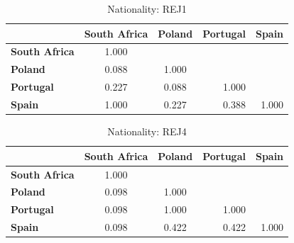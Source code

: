 \begin{table}
    \small
    \centering
    \begin{tabular}{lcccc}
        \toprule
                              & \multicolumn{1}{l}{\textbf{South Africa}} & \multicolumn{1}{l}{\textbf{Poland}} & \textbf{Portugal}         & \textbf{Spain}            \\
        \midrule
        \textbf{South Africa} & 1.000                                     & \multicolumn{1}{l}{}                &                           &                           \\
        \textbf{Poland}       & 0.088                                     & 1.000                               &                           &                           \\
        \textbf{Portugal}     & 0.227                                     & 0.088                               & \multicolumn{1}{r}{1.000} &                           \\
        \textbf{Spain}        & 1.000                                     & 0.227                               & \multicolumn{1}{r}{0.388} & \multicolumn{1}{r}{1.000} \\
        \bottomrule
    \end{tabular}
    \caption{Nationality: REJ1}
\end{table}

\begin{table}
    \small
    \centering
    \begin{tabular}{lcccc}
        \toprule
                              & \multicolumn{1}{l}{\textbf{South Africa}} & \multicolumn{1}{l}{\textbf{Poland}} & \textbf{Portugal}         & \textbf{Spain}            \\
        \midrule
        \textbf{South Africa} & 1.000                                     & \multicolumn{1}{l}{}                &                           &                           \\
        \textbf{Poland}       & 0.098                                     & 1.000                               &                           &                           \\
        \textbf{Portugal}     & 0.098                                     & 1.000                               & \multicolumn{1}{r}{1.000} &                           \\
        \textbf{Spain}        & 0.098                                     & 0.422                               & \multicolumn{1}{r}{0.422} & \multicolumn{1}{r}{1.000} \\
        \bottomrule
    \end{tabular}
    \caption{Nationality: REJ4}
\end{table}




